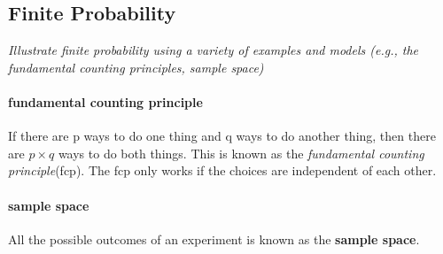 \subsection[Finite Probability]{Finite Probability}

\textit{Illustrate finite probability using a variety of examples and models (e.g., the fundamental counting principles, sample space)}

\paragraph*{fundamental counting principle} 

If there are p ways to do one thing and q ways to do another thing, then there are $ p \times q $ ways to do both things. This is known as the \textit{fundamental counting principle}(fcp). The fcp only works if the choices are independent of each other.

\paragraph*{sample space}

All the possible outcomes of an experiment is known as the \textbf{sample space}.